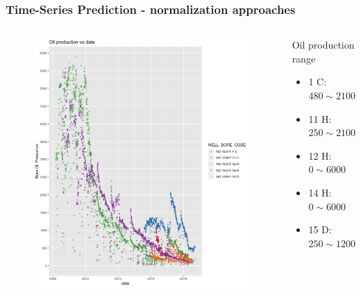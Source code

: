 \documentclass[xcolor=table]{beamer}
\begin{document}
\begin{frame}
\frametitle{Time-Series Prediction - normalization approaches}

\begin{columns}[c]
	
	\begin{figure}
		\includegraphics[width=0.9\linewidth,left]{OIL_VS_TIME.png} 
	\end{figure}
	
	\begin{block}{Oil production range}
	\begin{itemize}
		\item 1 C: $480\sim 2100$
		\item 11 H: $250\sim2100$
		\item 12 H: $0\sim6000$
		\item 14 H: $0\sim6000$
		\item 15 D: $250\sim1200$
	\end{itemize}
	
	\end{block}
\end{columns}



\end{frame}
\end{document}
